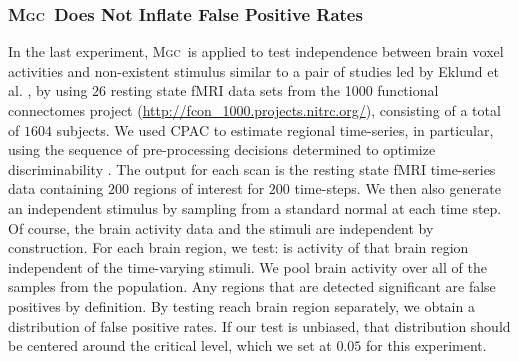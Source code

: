 \documentclass[11pt]{article}
\providecommand{\sct}[1]{{\normalfont\textsc{#1}}}
\newcommand{\Migraine}{\sct{Migraine}}
\newcommand{\mtg}{\sct{m2g}}
\newcommand{\Mgc}{\sct{Mgc}}
\newcommand{\Hhg}{\sct{Hhg}}
\newcommand{\Mantel}{\sct{Mantel}}
\begin{document}


\subsubsection*{\Mgc~Does Not Inflate False Positive Rates} %

In the last experiment, \Mgc~is applied to test independence between brain voxel activities and non-existent stimulus similar to a pair of studies led by Eklund et al. \cite{EklundKnutsson2012,Eklund2015}, by using $26$ resting state fMRI data sets from the 1000 functional connectomes project (\url{http://fcon_1000.projects.nitrc.org/}), consisting of a total of $1604$ subjects.
We used CPAC \cite{CPAC2015} to estimate regional time-series, in particular, using the sequence of pre-processing decisions determined to optimize discriminability \cite{Wang2016}.  The output for each scan is the resting state fMRI time-series data containing $200$ regions of interest for $200$ time-steps.
We then also generate an independent stimulus  by sampling from a standard normal at each time step.  Of course, the brain activity data and the stimuli are independent by construction.
For each brain region, we test: is activity of that  brain region independent of the time-varying stimuli. We pool brain activity over all of the samples from the population.
Any regions that are detected significant are false positives by definition.  By testing reach brain region separately, we obtain a distribution of false positive rates.  If our test is unbiased, that distribution should be centered around the critical level, which we set at $0.05$ for this experiment.
\end{document}
